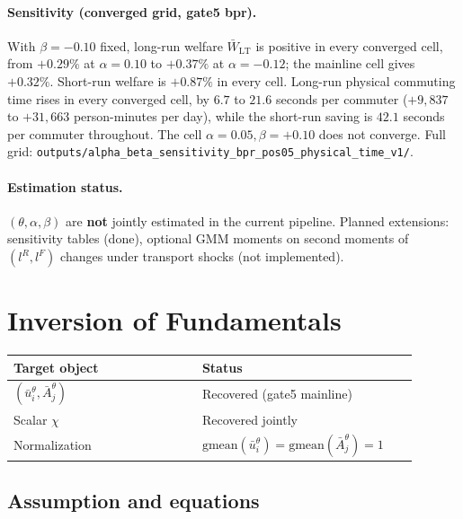 \documentclass[11pt]{article}
\newcommand{\Wbar}{\bar W}
\newcommand{\ubar}{\bar u}
\newcommand{\Abar}{\bar A}
\begin{document}
\paragraph{Sensitivity (converged grid, gate5 bpr).}
With $\beta=-0.10$ fixed, long-run welfare $\Wbar_{\mathrm{LT}}$ is
positive in every converged cell, from $+0.29\%$ at $\alpha=0.10$ to
$+0.37\%$ at $\alpha=-0.12$; the mainline cell gives $+0.32\%$. Short-run
welfare is $+0.87\%$ in every cell. Long-run physical commuting time rises
in every converged cell, by $6.7$ to $21.6$ seconds per commuter
($+9{,}837$ to $+31{,}663$ person-minutes per day), while the short-run
saving is $42.1$ seconds per commuter throughout. The cell
$\alpha=0.05,\beta=+0.10$ does not converge. Full grid:
\texttt{outputs/alpha\_beta\_sensitivity\_bpr\_pos05\_physical\_time\_v1/}.

\paragraph{Estimation status.}
$(\theta,\alpha,\beta)$ are \textbf{not} jointly estimated in the
current pipeline.  Planned extensions: sensitivity tables (done),
optional GMM moments on second moments of $(l^R,l^F)$ changes under
transport shocks (not implemented).

\section{Inversion of Fundamentals}\label{sec:invert}

\begin{longtable}{@{}p{0.42\linewidth}p{0.48\linewidth}@{}}
\toprule
\textbf{Target object} & \textbf{Status} \\
\midrule
\endhead
$(\ubar_i^{\theta},\Abar_j^{\theta})$ & Recovered (gate5 mainline) \\
Scalar $\chi$ & Recovered jointly \\
Normalization & $\mathrm{gmean}(\ubar_i^{\theta})=\mathrm{gmean}(\Abar_j^{\theta})=1$ \\
\bottomrule
\end{longtable}

\subsection{Assumption and equations}
\end{document}
